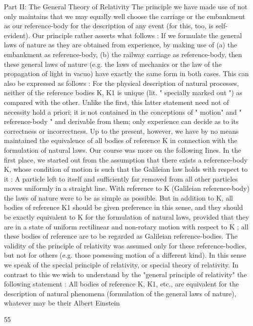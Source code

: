 \documentclass{article}
\begin{document}
Part II: The General Theory of Relativity
The principle we have made use of not only maintains that we may equally well choose
the carriage or the embankment as our reference-body for the description of any event (for
this, too, is self-evident). Our principle rather asserts what follows : If we formulate the
general laws of nature as they are obtained from experience, by making use of
(a) the embankment as reference-body,
(b) the railway carriage as reference-body,
then these general laws of nature (e.g. the laws of mechanics or the law of the propagation
of light in vacuo) have exactly the same form in both cases. This can also be expressed as
follows : For the physical description of natural processes, neither of the reference bodies
K, K1 is unique (lit. " specially marked out ") as compared with the other. Unlike the first,
this latter statement need not of necessity hold a priori; it is not contained in the
conceptions of " motion" and " reference-body " and derivable from them; only experience
can decide as to its correctness or incorrectness.
Up to the present, however, we have by no means maintained the equivalence of all
bodies of reference K in connection with the formulation of natural laws. Our course was
more on the following Iines. In the first place, we started out from the assumption that there
exists a reference-body K, whose condition of motion is such that the Galileian law holds
with respect to it : A particle left to itself and sufficiently far removed from all other
particles moves uniformly in a straight line. With reference to K (Galileian reference-body)
the laws of nature were to be as simple as possible. But in addition to K, all bodies of
reference K1 should be given preference in this sense, and they should be exactly equivalent
to K for the formulation of natural laws, provided that they are in a state of uniform
rectilinear and non-rotary motion with respect to K ; all these bodies of reference are to be
regarded as Galileian reference-bodies. The validity of the principle of relativity was
assumed only for these reference-bodies, but not for others (e.g. those possessing motion of
a different kind). In this sense we speak of the special principle of relativity, or special
theory of relativity.
In contrast to this we wish to understand by the "general principle of relativity" the
following statement : All bodies of reference K, K1, etc., are equivalent for the description
of natural phenomena (formulation of the general laws of nature), whatever may be their
Albert Einstein

55
\end{document}
